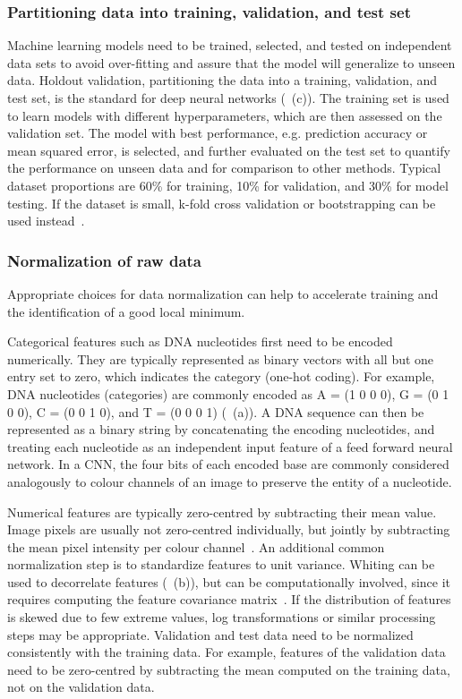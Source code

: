 \subsubsection{Partitioning data into training, validation, and test set} \label{sec:dl_eval}

Machine learning models need to be trained, selected, and tested on independent data sets to avoid over-fitting and assure that the model will generalize to unseen data. Holdout validation, partitioning the data into a training, validation, and test set, is the standard for deep neural networks (~(c)). The training set is used to learn models with different hyperparameters, which are then assessed on the validation set. The model with best performance, e.g. prediction accuracy or mean squared error, is selected, and further evaluated on the test set to quantify the performance on unseen data and for comparison to other methods. Typical dataset proportions are 60\% for training, 10\% for validation, and 30\% for model testing. If the dataset is small, k-fold cross validation or bootstrapping can be used instead~\citep{hastie_elements_2005}.


\subsubsection{Normalization of raw data}

Appropriate choices for data normalization can help to accelerate training and the identification of a good local minimum.

Categorical features such as DNA nucleotides first need to be encoded numerically. They are typically represented as binary vectors with all but one entry set to zero, which indicates the category (one-hot coding). For example, DNA nucleotides (categories) are commonly encoded as A = (1 0 0 0), G = (0 1 0 0), C = (0 0 1 0), and T = (0 0 0 1) (~(a)). A DNA sequence can then be represented as a binary string by concatenating the encoding nucleotides, and treating each nucleotide as an independent input feature of a feed forward neural network. In a CNN, the four bits of each encoded base are commonly considered analogously to colour channels of an image to preserve the entity of a nucleotide.

Numerical features are typically zero-centred by subtracting their mean value. Image pixels are usually not zero-centred individually, but jointly by subtracting the mean pixel intensity per colour channel~\citep{karpathy_cs231n_2016}. An additional common normalization step is to standardize features to unit variance. Whiting can be used to decorrelate features (~(b)), but can be computationally involved, since it requires computing the feature covariance matrix~\citep{hastie_elements_2005}. If the distribution of features is skewed due to few extreme values, log transformations or similar processing steps may be appropriate. Validation and test data need to be normalized consistently with the training data. For example, features of the validation data need to be zero-centred by subtracting the mean computed on the training data, not on the validation data.

